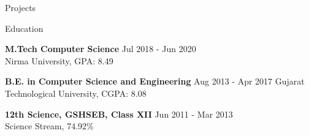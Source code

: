 \documentclass{resume} %
\begin{document}
\begin{rSection}{Projects}




\end{rSection}




\begin{rSection}{Education}

{\bf M.Tech Computer Science} \hfill {Jul 2018 - Jun 2020 }
\\ 
Nirma University, GPA: 8.49

{\bf B.E. in Computer Science and Engineering} \hfill {Aug 2013 - Apr 2017 }
Gujarat Technological University, CGPA: 8.08

{\textbf{12th Science, GSHSEB, Class XII}}  \hfill {Jun 2011 - Mar 2013 }\\
Science Stream, 74.92\% 
 


\end{rSection}
\end{document}
